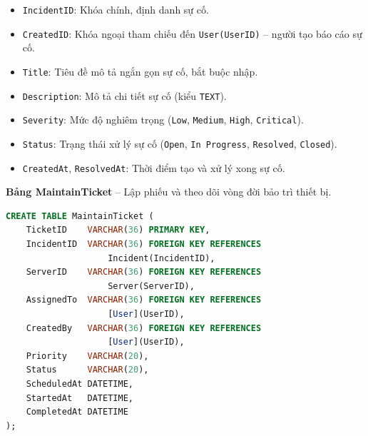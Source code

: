 \begin{itemize}[leftmargin=2em]
    \item \texttt{IncidentID}: Khóa chính, định danh sự cố.
    \item \texttt{CreatedID}: Khóa ngoại tham chiếu đến \texttt{User(UserID)} -- người tạo báo cáo sự cố.
    \item \texttt{Title}: Tiêu đề mô tả ngắn gọn sự cố, bắt buộc nhập.
    \item \texttt{Description}: Mô tả chi tiết sự cố (kiểu \texttt{TEXT}).
    \item \texttt{Severity}: Mức độ nghiêm trọng (\texttt{Low}, \texttt{Medium}, \texttt{High}, \texttt{Critical}).
    \item \texttt{Status}: Trạng thái xử lý sự cố (\texttt{Open}, \texttt{In Progress}, \texttt{Resolved}, \texttt{Closed}).
    \item \texttt{CreatedAt}, \texttt{ResolvedAt}: Thời điểm tạo và xử lý xong sự cố.
\end{itemize}

\vspace{0.5em}
\noindent\textbf{Bảng MaintainTicket} -- Lập phiếu và theo dõi vòng đời bảo trì thiết bị.

\begin{tcolorbox}[colback=gray!5, colframe=gray!60, title={\textbf{CREATE TABLE MaintainTicket}}, fonttitle=\bfseries\small, boxrule=0.5pt, arc=2pt]
\begin{lstlisting}[language=SQL, basicstyle=\ttfamily\small, breaklines=true, showstringspaces=false, keywordstyle=\bfseries\color{blue!70!black}, stringstyle=\color{red!70!black}, commentstyle=\itshape\color{green!50!black}]
CREATE TABLE MaintainTicket (
    TicketID    VARCHAR(36) PRIMARY KEY,
    IncidentID  VARCHAR(36) FOREIGN KEY REFERENCES
                    Incident(IncidentID),
    ServerID    VARCHAR(36) FOREIGN KEY REFERENCES
                    Server(ServerID),
    AssignedTo  VARCHAR(36) FOREIGN KEY REFERENCES
                    [User](UserID),
    CreatedBy   VARCHAR(36) FOREIGN KEY REFERENCES
                    [User](UserID),
    Priority    VARCHAR(20),
    Status      VARCHAR(20),
    ScheduledAt DATETIME,
    StartedAt   DATETIME,
    CompletedAt DATETIME
);
\end{lstlisting}
\end{tcolorbox}

